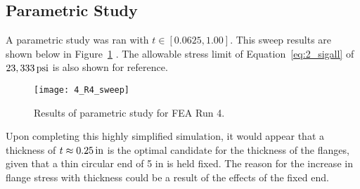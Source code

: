 \subsection{Parametric Study}

A parametric study was ran with $t \in [0.0625, 1.00]$. This sweep results are shown below in Figure~\ref{fig:4_R4_sweep} \cite{EXCEL}. The allowable stress limit of Equation~\ref{eq:2_sigall} of $23,333 \,\mathrm{psi}$ is also shown for reference.

\begin{figure}[H]
	\centering
	\texttt{[image: 4\_R4\_sweep]}
	\caption{Results of parametric study for FEA Run 4.}
	\label{fig:4_R4_sweep}
\end{figure}

Upon completing this highly simplified simulation, it would appear that a thickness of $t\approx 0.25 \,\mathrm{in}$ is the optimal candidate for the thickness of the flanges, given that a thin circular end of 5 in is held fixed. The reason for the increase in flange stress with thickness could be a result of the effects of the fixed end.

